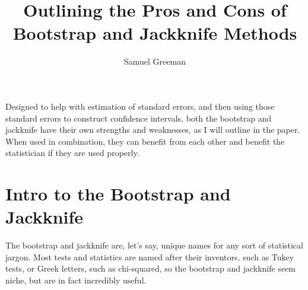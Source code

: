 \documentclass[12pt]{article}
\title{Outlining the Pros and Cons of Bootstrap and Jackknife Methods}
\author{Samuel Greeman}
\date{}
\begin{document}
\maketitle
\begin{flushleft}




\setdefaultleftmargin{0pt}{}{}{}{}{}




Designed to help with estimation of standard errors, and then using those standard errors to construct confidence intervals, both the bootstrap and jackknife have their own strengths and weaknesses, as I will outline in the paper. When used in combination, they can benefit from each other and benefit the statistician if they are used properly.\\

\section{Intro to the Bootstrap and Jackknife}\label{sec:intro}
The bootstrap and jackknife are, let's say, unique names for any sort of statistical jargon. Most tests and statistics are named after their inventors, such as Tukey tests, or Greek letters, such as chi-squared, so the bootstrap and jackknife seem niche, but are in fact incredibly useful.\\


\end{flushleft}
\end{document}
